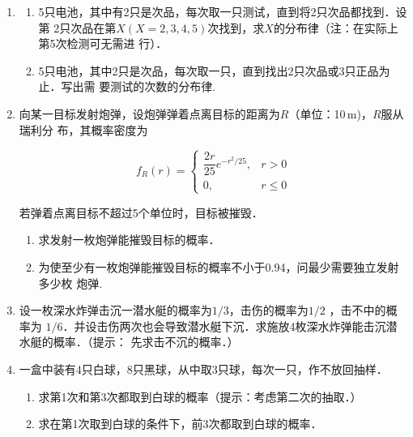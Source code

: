 \documentclass[10pt,a4paper]{article}
\begin{document}
\begin{enumerate}
    \item \begin{enumerate}
        \item 5只电池，其中有2只是次品，每次取一只测试，直到将2只次品都找到．设第
        2只次品在第$X(X=2,3,4,5)$次找到，求$X$的分布律（注：在实际上第5次检测可无需进
        行）．
        \item 5只电池，其中2只是次品，每次取一只，直到找出2只次品或3只正品为止．写出需
        要测试的次数的分布律.
    \end{enumerate}
    \clearpage


    \item 向某一目标发射炮弹，设炮弹弹着点离目标的距离为$R$（单位：10$\, $m)，$R$服从瑞利分
    布，其概率密度为
    \vspace{-0.5cm}
    \begin{spacing}{2.0}
    $$f_R(r)=\left\{\begin{array}{ll}
        \dfrac{2r}{25}e^{-r^2/25},& r>0\\
        0, & r\leq 0
    \end{array}\right.$$
    \end{spacing}
    \vspace{-0.5cm}
    若弹着点离目标不超过5个单位时，目标被摧毁．
    \begin{enumerate}
        \item 求发射一枚炮弹能摧毁目标的概率．
        \item 为使至少有一枚炮弹能摧毁目标的概率不小于0.94，问最少需要独立发射多少枚
        炮弹.
    \end{enumerate}
    \clearpage
    



    \item 设一枚深水炸弹击沉一潜水艇的概率为$1/3$，击伤的概率为$1/2$ ，击不中的概率为
    $1/6$．并设击伤两次也会导致潜水艇下沉．求施放4枚深水炸弹能击沉潜水艇的概率．（提示：
    先求击不沉的概率．）
    \clearpage


    \item 一盒中装有4只白球，8只黑球，从中取3只球，每次一只，作不放回抽样．
    \begin{enumerate}
        \item 求第1次和第3次都取到白球的概率（提示：考虑第二次的抽取．）
        \item 求在第1次取到白球的条件下，前3次都取到白球的概率．
    \end{enumerate}
    \clearpage




\end{enumerate}
\end{document}
